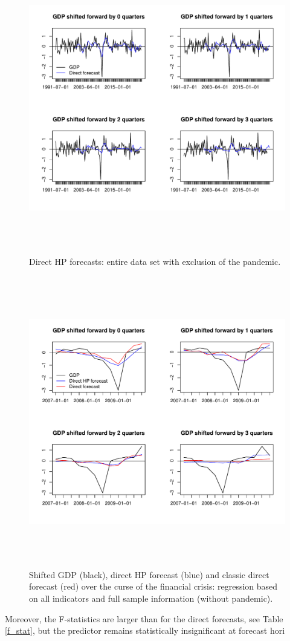 \documentclass[a4paper]{article}
\begin{document}
\begin{figure}[H]\begin{center}\includegraphics[height=5in, width=6in]{./Figures/direct_hp_forecasts.pdf}\caption{Direct HP forecasts: entire data set with exclusion of the pandemic.\label{direct_hp_forecasts}}\end{center}\end{figure}\begin{figure}[H]\begin{center}\includegraphics[height=5in, width=6in]{./Figures/direct_hp_forecasts_financial_crisis.pdf}\caption{Shifted GDP (black), direct HP forecast (blue) and classic direct forecast (red) over the curse of the financial crisis:  regression based on all indicators and full sample information (without pandemic).\label{direct_hp_forecasts_financial_crisis}}\end{center}\end{figure}Moreover, the F-statistics are larger than for the direct forecasts, see Table \eqref{f_stat}, but the predictor remains statistically insignificant at forecast hori
\end{document}
